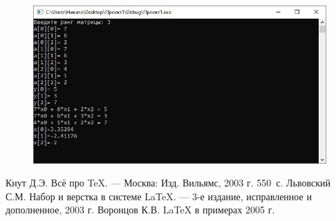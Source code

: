 \documentclass[12pt,a4paper]{scrartcl}
\begin{document}
\begin{figure}[h]
	\centering
	
	\includegraphics[width=1\textwidth]{prog.jpg}
\end{figure}

\begin{thebibliography}{9}
Кнут Д.Э. Всё про \TeX. \newblock --- Москва: Изд. Вильямс, 2003 г. 550~с.
Львовский С.М. Набор и верстка в системе \LaTeX{}. \newblock --- 3-е издание, исправленное и дополненное, 2003 г.
Воронцов К.В. \LaTeX{} в примерах 2005 г.
\end{thebibliography}
\end{document}
